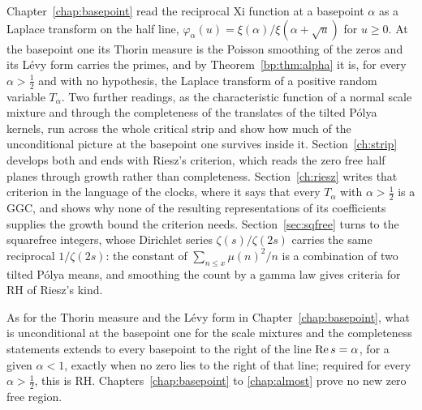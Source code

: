 \label{chap:strip}

Chapter~\ref{chap:basepoint} read the reciprocal Xi function at a basepoint $\alpha$ as a Laplace transform on the half line, $\varphi_\alpha(u)=\xi(\alpha)/\xi(\alpha+\sqrt u)$ for $u\ge0$. At the basepoint one its Thorin measure is the Poisson smoothing of the zeros and its L\'evy form carries the primes, and by Theorem~\ref{bp:thm:alpha} it is, for every $\alpha>\frac12$ and with no hypothesis, the Laplace transform of a positive random variable $T_\alpha$. Two further readings, as the characteristic function of a normal scale mixture and through the completeness of the translates of the tilted P\'olya kernels, run across the whole critical strip and show how much of the unconditional picture at the basepoint one survives inside it. Section~\ref{ch:strip} develops both and ends with Riesz's criterion, which reads the zero free half planes through growth rather than completeness. Section~\ref{ch:riesz} writes that criterion in the language of the clocks, where it says that every $T_\alpha$ with $\alpha>\frac12$ is a GGC, and shows why none of the resulting representations of its coefficients supplies the growth bound the criterion needs. Section~\ref{sec:sqfree} turns to the squarefree integers, whose Dirichlet series $\zeta(s)/\zeta(2s)$ carries the same reciprocal $1/\zeta(2s)$: the constant of $\sum_{n\le x}\mu(n)^2/n$ is a combination of two tilted P\'olya means, and smoothing the count by a gamma law gives criteria for RH of Riesz's kind.

As for the Thorin measure and the L\'evy form in Chapter~\ref{chap:basepoint}, what is unconditional at the basepoint one for the scale mixtures and the completeness statements extends to every basepoint to the right of the line $\operatorname{Re} s=\alpha$, for a given $\alpha<1$, exactly when no zero lies to the right of that line; required for every $\alpha>\frac12$, this is RH. Chapters~\ref{chap:basepoint} to \ref{chap:almost} prove no new zero free region.
